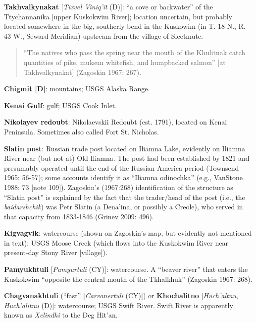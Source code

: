 \begin{hang}




\textbf{Takhvalkynakat} [\textit{Tixveł Viniq’it} (D)]: “a cove or backwater” of the Ttychannanika [upper Kuskokwim River]; location uncertain, but probably located somewhere in the big, southerly bend in the Kuskowim (in T. 18 N., R. 43 W., Seward Meridian) upstream from the village of Sleetmute.



\begin{quote}“The natives who pass the spring near the mouth of the Khulitnak catch quantities of pike, muksun whitefish, and humpbacked salmon” [at Takhvalkynakat] (Zagoskin 1967: 267).
\end{quote}


\textbf{Chigmit [D]}: mountains; USGS Alaska Range.



\textbf{Kenai Gulf}: gulf; USGS Cook Inlet.



\textbf{Nikolayev redoubt}: Nikolaevskii Redoubt (est. 1791), located on Kenai Peninsula. Sometimes also called Fort St. Nicholas.



\textbf{Slatin post}: Russian trade post located on Iliamna Lake, evidently on Iliamna River near (but not at) Old Iliamna. The post had been established by 1821 and presumably operated until the end of the Russian America period (Townsend 1965: 56-57); some accounts identify it as “Iliamna odinochka” (e.g., VanStone 1988: 73 [note 109]). Zagoskin’s (1967:268) identification of the structure as “Slatin post” is explained by the fact that the trader/head of the post (i.e., the \textit{baidarshchik}) was Petr Slatin (a Dena’ina, or possibly a Creole), who served in that capacity from 1833-1846 (Grinev 2009: 496).



\textbf{Kigvagvik}: watercourse (shown on Zagoskin’s map, but evidently not mentioned in text); USGS Moose Creek (which flows into the Kuskokwim River near present-day Stony River [village]).



\textbf{Pamyukhtuli} [\textit{Pamyurtuli} (CY)]: watercourse. A “beaver river” that enters the Kuskokwim “opposite the central mouth of the Tkhalkhuk” (Zagoskin 1967: 268).



\textbf{Chagvanakhtuli} (“fast” [\textit{Carvanertuli} (CY)]) or \textbf{Khochalitno} [\textit{Huch’altnu}, \textit{Huch’alitnu} (D)]: watercourse; USGS Swift River. Swift River is apparently known as \textit{Xelindhi} to the Deg Hit’an.




\end{hang}
